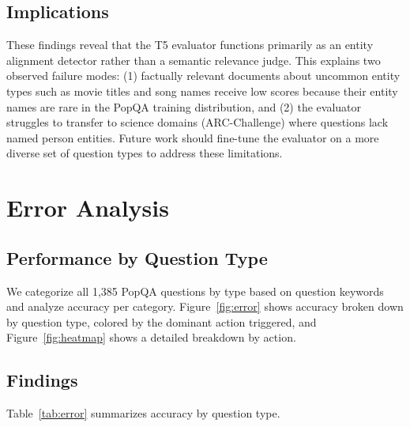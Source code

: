 \documentclass[11pt]{article}
\begin{document}
\subsection{Implications}

These findings reveal that the T5 evaluator functions primarily as an entity alignment detector
rather than a semantic relevance judge. This explains two observed failure modes: (1) factually
relevant documents about uncommon entity types such as movie titles and song names receive low
scores because their entity names are rare in the PopQA training distribution, and (2) the
evaluator struggles to transfer to science domains (ARC-Challenge) where questions lack named
person entities. Future work should fine-tune the evaluator on a more diverse set of question types
to address these limitations.

\section{Error Analysis}

\subsection{Performance by Question Type}

We categorize all 1,385 PopQA questions by type based on question keywords and analyze accuracy
per category. Figure~\ref{fig:error} shows accuracy broken down by question type, colored by the
dominant action triggered, and Figure~\ref{fig:heatmap} shows a detailed breakdown by action.

\subsection{Findings}

Table~\ref{tab:error} summarizes accuracy by question type.
\end{document}
